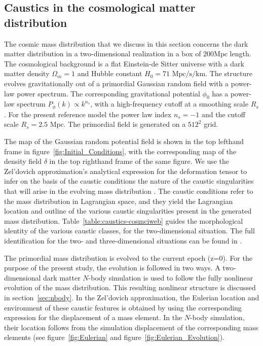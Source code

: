 \documentclass[a4paper, 11pt]{article}
\begin{document}
\subsection{Caustics in the cosmological matter distribution}
\label{sec:primordial}
The cosmic mass distribution that we discuss in this section concerns the dark matter distribution in a two-dimensional realization in a box of $200 \mbox{Mpc}$ length. The cosmological background is a flat Einstein-de Sitter universe with a dark matter density $\Omega_m=1$ and Hubble constant $H_0=71\text{ Mpc/s/km}$. The structure evolves gravitationally out of a primordial Gaussian random field with a power-law power spectrum. The corresponding gravitational potential $\phi_0$ has a power-law spectrum $P_{\phi}(k) \propto k^{n_s}$, with a high-frequency cutoff at a smoothing scale $R_s$. For the present reference model the power law index $n_s=-1$ and the cutoff scale
$R_s=2.5 \text{ Mpc}$. The primordial field is generated on a $512^2$ grid.

The map of the Gaussian random potential field is shown in the top lefthand frame in figure~\ref{fig:Initial_Conditions}, with the corresponding map of the density field $\delta$ in the top righthand frame of the same figure. We use the Zel'dovich approximation's analytical expression for the deformation tensor to infer on the basis of the caustic conditions the nature of the caustic singularities that will arise in the evolving mass distribution \cite{Feldbrugge:2018}. The caustic conditions refer to the mass distribution in Lagrangian space, and they yield the Lagrangian location and outline of the various caustic singularities present in the generated mass distribution.  Table~\ref{table:caustics-cosmciweb} guides the morphological identity of the various caustic classes, for the two-dimensional situation. The full identification for the two- and three-dimensional situations can be found in \cite{Feldbrugge:2018}.

The primordial mass distribution is evolved to the current epoch (z=0). For the purpose of the present study, the evolution is followed in two ways. A two-dimensional dark matter $N$-body simulation \cite{Hidding:2020} is used to follow the fully nonlinear evolution of the mass distribution. This resulting nonlinear structure is discussed in section~\ref{sec:nbody}. In the Zel'dovich approximation, the Eulerian location and environment of these caustic features is obtained by using the corresponding expression for the displacement of a mass element. In the $N$-body simulation, their location follows from the simulation displacement of the corresponding mass elements (see figure~\ref{fig:Eulerian} and figure~\ref{fig:Eulerian_Evolution}).
\end{document}
